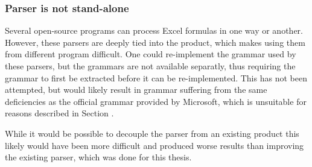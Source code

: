 \subsubsection{Parser is not stand-alone}

Several open-source programs \cite{libreoffice,calligra,gnumeric} can process Excel formulas in one way or another.
However, these parsers are deeply tied into the product, which makes using them from different program difficult.
One could re-implement the grammar used by these parsers, but the grammars are not available separatly, thus requiring the grammar to first be extracted before it can be re-implemented. This has not been attempted, but would likely result in grammar suffering from the same deficiencies as the official grammar provided by Microsoft, which is unsuitable for reasons described in Section \label{sec:motivation}.

While it would be possible to decouple the parser from an existing product this likely would have been more difficult and produced worse results than improving the existing parser, which was done for this thesis.